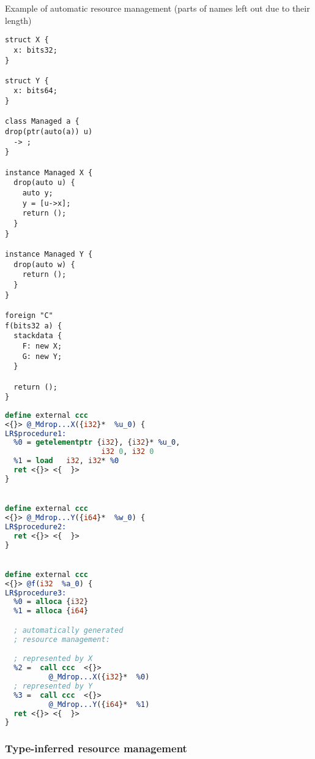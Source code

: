\begin{listing}
    \small
    \caption{Example of automatic resource management (parts of names left out due to their length)}
    \label{lst:resource}
    \begin{center}
    \begin{minipage}{0.35\linewidth}
    \begin{lstlisting}
struct X {
  x: bits32;
}

struct Y {
  x: bits64;
}

class Managed a {
drop(ptr(auto(a)) u)
  -> ;
}

instance Managed X {
  drop(auto u) {
    auto y;
    y = [u->x];
    return ();
  }
}

instance Managed Y {
  drop(auto w) {
    return ();
  }
}

foreign "C"
f(bits32 a) {
  stackdata {
    F: new X;
    G: new Y;
  }

  return ();
}
    \end{lstlisting}
    \end{minipage}%
    \begin{minipage}{0.65\linewidth}
    \begin{lstlisting}[language=LLVM]
define external ccc
<{}> @_Mdrop...X({i32}*  %u_0) {
LR$procedure1:
  %0 = getelementptr {i32}, {i32}* %u_0,
                      i32 0, i32 0
  %1 = load   i32, i32* %0
  ret <{}> <{  }>
}


define external ccc
<{}> @_Mdrop...Y({i64}*  %w_0) {
LR$procedure2:
  ret <{}> <{  }>
}


define external ccc
<{}> @f(i32  %a_0) {
LR$procedure3:
  %0 = alloca {i32}
  %1 = alloca {i64}

  ; automatically generated
  ; resource management:

  ; represented by X
  %2 =  call ccc  <{}>
          @_Mdrop...X({i32}*  %0)
  ; represented by Y
  %3 =  call ccc  <{}>
          @_Mdrop...Y({i64}*  %1)
  ret <{}> <{  }>
}
    \end{lstlisting}
    \end{minipage}
    \end{center}
\end{listing}

\subsubsection{Type-inferred resource management}

